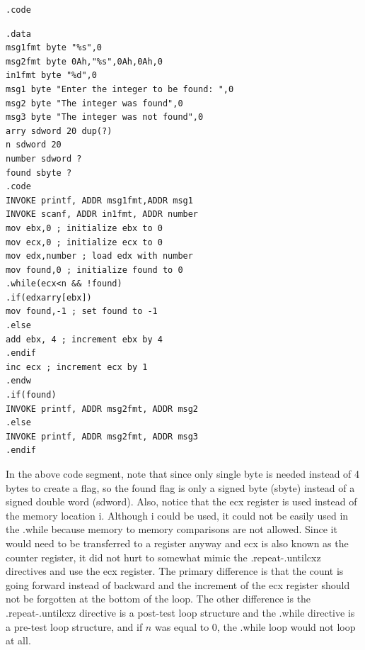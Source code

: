\documentclass[10pt]{book}
\begin{document}
\begin{verbatim}
.code
\end{verbatim}
\begin{verbatim}
.data
msg1fmt byte "%s",0
msg2fmt byte 0Ah,"%s",0Ah,0Ah,0
in1fmt byte "%d",0
msg1 byte "Enter the integer to be found: ",0
msg2 byte "The integer was found",0
msg3 byte "The integer was not found",0
arry sdword 20 dup(?)
n sdword 20
number sdword ?
found sbyte ?
.code
INVOKE printf, ADDR msg1fmt,ADDR msg1
INVOKE scanf, ADDR in1fmt, ADDR number
mov ebx,0 ; initialize ebx to 0
mov ecx,0 ; initialize ecx to 0
mov edx,number ; load edx with number
mov found,0 ; initialize found to 0
.while(ecx<n && !found)
.if(edxarry[ebx])
mov found,-1 ; set found to -1
.else
add ebx, 4 ; increment ebx by 4
.endif
inc ecx ; increment ecx by 1
.endw
.if(found)
INVOKE printf, ADDR msg2fmt, ADDR msg2
.else
INVOKE printf, ADDR msg2fmt, ADDR msg3
.endif
\end{verbatim}

In the above code segment, note that since only single byte is needed instead of 4 bytes to create a flag, so the found flag is only a signed byte (sbyte) instead of a signed double word (sdword). Also, notice that the ecx register is used instead of the memory location i. Although i could be used, it could not be easily used in the .while because memory to memory comparisons are not allowed. Since it would need to be transferred to a register anyway and ecx is also known as the counter register, it did not hurt to somewhat mimic the .repeat-.untilcxz directives and use the ecx register. The primary difference is that the count is going forward instead of backward and the increment of the ecx register should not be forgotten at the bottom of the loop. The other difference is the .repeat-.untilcxz directive is a post-test loop structure and the .while directive is a pre-test loop structure, and if $n$ was equal to 0, the .while loop would not loop at all.
\end{document}
